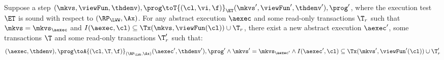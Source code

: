 \begin{lemma}
    \label{lem:aux-et-soundness-single-step-sound}
    Suppose a step \( (\mkvs, \viewFun, \thdenv), \prog \toT{(\cl, \vi, \f)}_{\ET} (\mkvs', \viewFun', \thdenv'), \prog' \), 
    where the execution test \( \ET \) is sound with respect to \( (\RP_{\LWW}, \Ax) \).
    For any abstract execution \( \aexec \) and some read-only transactions \( \T_{r} \) such that \( \mkvs = \mkvs_\aexec \) and \( I(\aexec, \cl) \subseteq \Tx(\mkvs, \viewFun(\cl)) \cup \T_{r}\),
    there exist a new abstract execution \( \aexec' \), some transactions \( \T \) and some read-only transactions \( \T'_{r} \) such that: 
    \[
        (\aexec, \thdenv), \prog \toA{(\cl, \T, \f)}_{(\RP_{\LWW}, \Ax)} (\aexec', \thdenv'), \prog' \land \mkvs' = \mkvs_{\aexec'} 
        \land I(\aexec', \cl) \subseteq \Tx(\mkvs', \viewFun'(\cl)) \cup \T'_{r}
    \]
\end{lemma}
